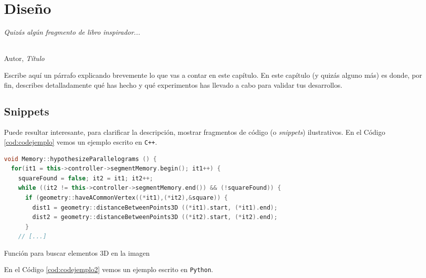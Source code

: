 \chapter{Diseño}
\label{cap:capitulo5}

\begin{flushright}
\begin{minipage}[]{10cm}
\emph{Quizás algún fragmento de libro inspirador...}\\
\end{minipage}\\

Autor, \textit{Título}\\
\end{flushright}

\vspace{1cm}

Escribe aquí un párrafo explicando brevemente lo que vas a contar en este capítulo. En este capítulo (y quizás alguno más) es donde, por fin, describes detalladamente qué has hecho y qué experimentos has llevado a cabo para validar tus desarrollos.

\section{Snippets}

Puede resultar interesante, para clarificar la descripción, mostrar fragmentos de código (o \textit{snippets}) ilustrativos. En el Código \ref{cod:codejemplo} vemos un ejemplo escrito en \texttt{C++}.

\begin{code}[h]
\begin{lstlisting}[language=C++]
void Memory::hypothesizeParallelograms () {
  for(it1 = this->controller->segmentMemory.begin(); it1++) {
    squareFound = false; it2 = it1; it2++;
    while ((it2 != this->controller->segmentMemory.end()) && (!squareFound)) {
      if (geometry::haveACommonVertex((*it1),(*it2),&square)) {
        dist1 = geometry::distanceBetweenPoints3D ((*it1).start, (*it1).end);
        dist2 = geometry::distanceBetweenPoints3D ((*it2).start, (*it2).end);
      }
    // [...]
\end{lstlisting}
\caption[Función para buscar elementos 3D en la imagen]{Función para buscar elementos 3D en la imagen}
\label{cod:codejemplo}
\end{code}

En el Código \ref{cod:codejemplo2} vemos un ejemplo escrito en \texttt{Python}.

